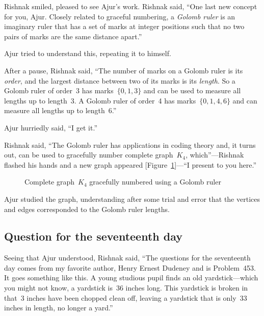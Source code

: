 Rishnak smiled, pleased to see Ajur's work. Rishnak said, ``One last new concept for you, Ajur. Closely related to graceful numbering, a \textit{Golomb ruler} is an imaginary ruler that has a set of marks at integer positions such that no two pairs of marks are the same distance apart.'' 

Ajur tried to understand this, repeating it to himself.

After a pause, Rishnak said, ``The number of marks on a Golomb ruler is its \textit{order}, and the largest distance between two of its marks is its \textit{length}. So a Golomb ruler of order~3 has marks~$\{0,1,3\}$ and can be used to measure all lengths up to length~3. A Golomb ruler of order~4 has marks~$\{0,1,4,6\}$ and can measure all lengths up to length~6.''

Ajur hurriedly said, ``I get it.''

Rishnak said, ``The Golomb ruler has applications in coding theory and, it turns out, can be used to gracefully number complete graph~$K_4$, which''---Rishnak flashed his hands and a new graph appeared [Figure~\ref{19g5}]---``I present to you here.''

\begin{figure}
\begin{center}


\caption{Complete graph~$K_4$ gracefully numbered using a Golomb ruler}\label{19g5}
\end{center}
\end{figure}

Ajur studied the graph, understanding after some trial and error that the vertices and edges corresponded to the Golomb ruler lengths.

\subsection*{Question for the seventeenth day}
Seeing that Ajur understood, Rishnak said, ``The questions for the seventeenth day comes from my favorite author, Henry Ernest Dudeney and is Problem~453. It goes something like this. A young studious pupil finds an old yardstick---which you might not know, a yardstick is~36 inches long.
This yardstick is broken in that~3 inches have been chopped clean off, leaving a yardstick that is only~33 inches in length, no longer a yard.''

